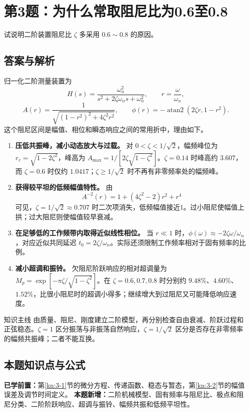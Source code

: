 \section{第3题：为什么常取阻尼比为0.6至0.8}
\label{hw:3-3}
\begin{hwquestion}
试说明二阶装置阻尼比 $\zeta$ 多采用 $0.6\sim0.8$ 的原因。
\end{hwquestion}

\subsection*{答案与解析}
归一化二阶测量装置为
\[
H(s)=\frac{\omega_n^2}{s^2+2\zeta\omega_ns+\omega_n^2},
\qquad r=\frac{\omega}{\omega_n},
\]
\[
A(r)=\frac{1}{\sqrt{(1-r^2)^2+4\zeta^2r^2}},\qquad
\phi(r)=-\operatorname{atan2}(2\zeta r,1-r^2).
\]
这个阻尼区间是幅值、相位和瞬态响应之间的常用折中，理由如下。
\begin{enumerate}[leftmargin=*]
\item \textbf{压低共振峰，减小动态放大与过载。}
对 $0<\zeta<1/\sqrt2$，幅频峰位为 $r_r=\sqrt{1-2\zeta^2}$，峰高为
$A_{\max}=1/[2\zeta\sqrt{1-\zeta^2}]$。$\zeta=0.14$ 时峰高约 $3.607$，而 $\zeta=0.6$ 时仅约 $1.0417$；$\zeta\geq1/\sqrt2$ 时不再有非零频率处的幅频峰。
\item \textbf{获得较平坦的低频幅值特性。}
由
\[
A^{-2}(r)=1+(4\zeta^2-2)r^2+r^4
\]
可见，$\zeta=1/\sqrt2\approx0.707$ 时二次项消失，低频幅值接近1。过小阻尼使幅值上拱；过大阻尼则使幅值较早衰减。
\item \textbf{在足够低的工作频带内取得近似线性相位。}
当 $r\ll1$ 时，$\phi(\omega)\approx-2\zeta\omega/\omega_n$，对应近似共同延迟 $t_0=2\zeta/\omega_n$。实际还须限制工作频率相对于固有频率的比例。
\item \textbf{减小超调和振铃。}
欠阻尼阶跃响应的相对超调量为
$M_p=\exp[-\pi\zeta/\sqrt{1-\zeta^2}]$。在 $\zeta=0.6,0.7,0.8$ 时分别约 $9.48\%$、$4.60\%$、$1.52\%$，比很小阻尼时的超调小得多；继续增大到过阻尼又可能降低响应速度。
\end{enumerate}

\begin{focusbox}{知识主线}
由质量、阻尼、刚度建立二阶模型，再分别检查自由衰减、阶跃过程和正弦稳态。$\zeta=1$ 区分振荡与非振荡自然响应，$\zeta=1/\sqrt2$ 区分是否存在非零频率的幅频共振峰；二者不能互换。
\end{focusbox}

\subsection*{本题知识点与公式}
\label{kn:3-3}
\noindent\textbf{已学前置：}第\ref{kn:3-1}节的微分方程、传递函数、稳态与暂态，第\ref{kn:3-2}节的幅值误差及调节时间定义。
\textbf{本题新增：}二阶机械模型、固有频率与阻尼比、极点和阻尼分类、二阶阶跃响应、超调与振铃、幅频共振和低频平坦性。

